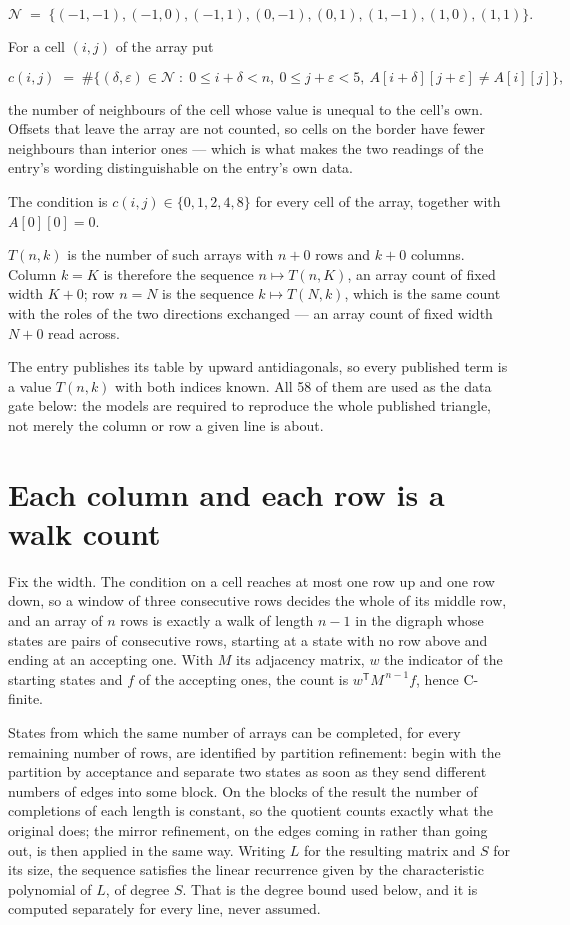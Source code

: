 \documentclass[11pt]{article}
\theoremstyle{definition}
\begin{document}
\[\mathcal{N} \;=\; \{(-1,-1), (-1,0), (-1,1), (0,-1), (0,1), (1,-1), (1,0), (1,1)\}.\]

For a cell $(i,j)$ of the array put

\[c(i,j) \;=\; \#\bigl\{(\delta,\varepsilon)\in\mathcal{N} \;:\; 0\le i+\delta<n,\ 0\le j+\varepsilon<5,\ A[i+\delta][j+\varepsilon] \neq A[i][j]\bigr\},\]

the number of neighbours of the cell whose value is unequal to the cell's own. Offsets that leave the array are not counted, so cells on the border have fewer neighbours than interior ones --- which is what makes the two readings of the entry's wording distinguishable on the entry's own data.

The condition is $c(i,j) \in \{0, 1, 2, 4, 8\}$ for every cell of the array, together with $A[0][0]=0$.

$T(n,k)$ is the number of such arrays with $n + 0$ rows and $k + 0$ columns. Column $k = K$ is therefore the sequence $n \mapsto T(n,K)$, an array count of fixed width $K + 0$; row $n = N$ is the sequence $k \mapsto T(N,k)$, which is the same count with the roles of the two directions exchanged --- an array count of fixed width $N + 0$ read across.

The entry publishes its table by upward antidiagonals, so every published term is a value $T(n,k)$ with both indices known. All 58 of them are used as the data gate below: the models are required to reproduce the whole published triangle, not merely the column or row a given line is about.

\section{Each column and each row is a walk count}

Fix the width. The condition on a cell reaches at most one row up and one row down, so a window of three consecutive rows decides the whole of its middle row, and an array of $n$ rows is exactly a walk of length $n-1$ in the digraph whose states are pairs of consecutive rows, starting at a state with no row above and ending at an accepting one. With $M$ its adjacency matrix, $w$ the indicator of the starting states and $f$ of the accepting ones, the count is $w^{\mathsf T}M^{\,n-1}f$, hence C-finite.

States from which the same number of arrays can be completed, for every remaining number of rows, are identified by partition refinement: begin with the partition by acceptance and separate two states as soon as they send different numbers of edges into some block. On the blocks of the result the number of completions of each length is constant, so the quotient counts exactly what the original does; the mirror refinement, on the edges coming in rather than going out, is then applied in the same way. Writing $L$ for the resulting matrix and $S$ for its size, the sequence satisfies the linear recurrence given by the characteristic polynomial of $L$, of degree $S$. That is the degree bound used below, and it is computed separately for every line, never assumed.
\end{document}
